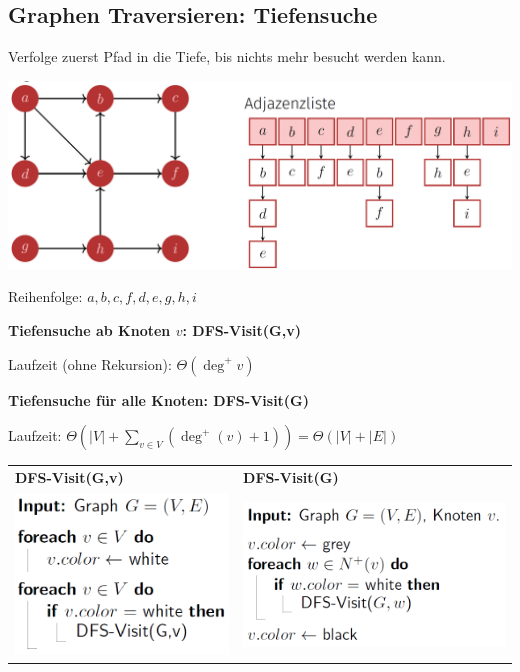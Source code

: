 \vspace{-4pt}
\begin{sectionbox}
\subsection{Graphen Traversieren: Tiefensuche}\smallskip
Verfolge zuerst Pfad in die Tiefe, bis nichts mehr besucht werden kann.\par
\begin{center}
    \includegraphics[width = 0.9\columnwidth]{../img/DFS_sym.png}
\end{center}\par
Reihenfolge: $a, b, c, f, d, e, g, h, i$\medskip

\textbf{Tiefensuche ab Knoten $v$: DFS-Visit(G,v)}\par
Laufzeit (ohne Rekursion): $\Theta\left(\operatorname{deg}^{+} v\right)$\par\smallskip

\textbf{Tiefensuche für alle Knoten: DFS-Visit(G)}\par
Laufzeit: $\Theta(|V|+\sum_{v \in V}(\operatorname{deg}^{+}(v)+1))=\Theta(|V|+|E|)$\par\smallskip

\begin{tabular*}{\columnwidth}{@{\extracolsep\fill}ll@{}}
\textbf{DFS-Visit(G,v)} & \textbf{DFS-Visit(G)} \\
\includegraphics[width = 0.40\columnwidth]{../img/DFSG.png} &
\includegraphics[width = 0.54\columnwidth]{../img/DFSGv.png} \\
\end{tabular*}\smallskip
\end{sectionbox}
